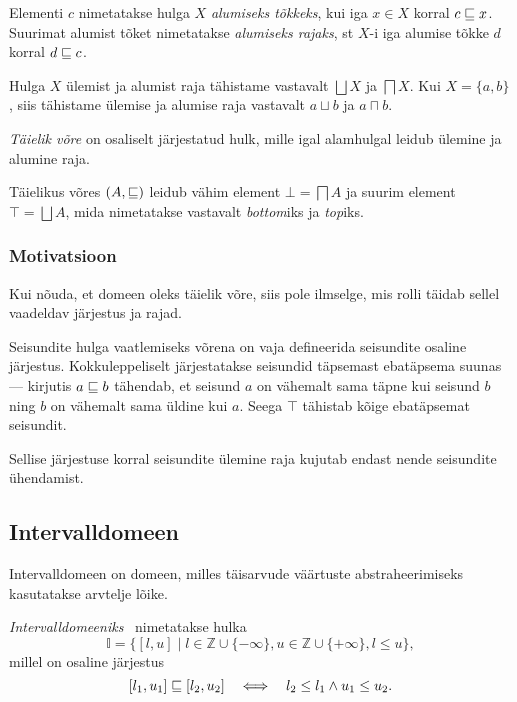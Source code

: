 \documentclass[../thesis.tex]{subfiles}
\begin{document}
\begin{definition}
Elementi $c$ nimetatakse hulga $X$ \emph{alumiseks tõkkeks}, kui iga $x \in X$ korral $c \sqsubseteq x$. Suurimat alumist tõket nimetatakse \emph{alumiseks rajaks}, st $X$-i iga alumise tõkke $d$ korral $d \sqsubseteq c$.
\end{definition}

Hulga $X$ ülemist ja alumist raja tähistame vastavalt $\bigsqcup X$ ja $\bigsqcap X$. Kui $X = \{a, b\}$, siis tähistame ülemise ja alumise raja vastavalt $a \sqcup b$ ja $a \sqcap b$.

\begin{definition}
\emph{Täielik võre} on osaliselt järjestatud hulk, mille igal alamhulgal leidub ülemine ja alumine raja.
\end{definition}

Täielikus võres $(A, \sqsubseteq)$ leidub vähim element $\bot = \bigsqcap A$ ja suurim element $\top = \bigsqcup A$, mida nimetatakse vastavalt \textit{bottom}iks ja \textit{top}iks.

\subsubsection{Motivatsioon}
Kui nõuda, et domeen oleks täielik võre, siis pole ilmselge, mis rolli täidab sellel vaadeldav järjestus ja rajad.

Seisundite hulga vaatlemiseks võrena on vaja defineerida seisundite osaline järjestus. Kokkuleppeliselt järjestatakse seisundid täpsemast ebatäpsema suunas --- kirjutis $a \sqsubseteq b$ tähendab, et seisund $a$ on vähemalt sama täpne kui seisund $b$ ning $b$ on vähemalt sama üldine kui $a$. Seega $\top$ tähistab kõige ebatäpsemat seisundit.

Sellise järjestuse korral seisundite ülemine raja kujutab endast nende seisundite ühendamist.


\subsection{Intervalldomeen}
Intervalldomeen on domeen, milles täisarvude väärtuste abstraheerimiseks kasutatakse arvtelje lõike.

\begin{definition}
\emph{Intervalldomeeniks}~\cite[55]{seidl_foundations} nimetatakse hulka
\[
	\mathbb{I} = \{ [l, u] \mid l \in \mathbb{Z} \cup \{-\infty\}, u \in \mathbb{Z} \cup \{+\infty\}, l \leq u \},
\]
millel on osaline järjestus
\[
	[l_1, u_1] \sqsubseteq [l_2, u_2] \quad\Longleftrightarrow\quad l_2 \leq l_1 \land u_1 \leq u_2.
\]
\end{definition}

\end{document}
